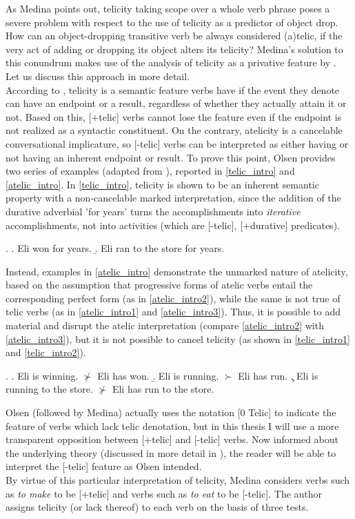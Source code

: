 As Medina points out, telicity taking scope over a whole verb phrase poses a severe problem with respect to the use of telicity as a predictor of object drop. How can an object-dropping transitive verb be always considered (a)telic, if the very act of adding or dropping its object alters its telicity? Medina's solution to this conundrum makes use of the analysis of telicity as a privative feature by \textcite{Olsen1997}. Let us discuss this approach in more detail.\\
According to \textcite[32]{Olsen1997}, telicity is a semantic feature verbs have if the event they denote can have an endpoint or a result, regardless of whether they actually attain it or not. Based on this, [+telic] verbs cannot lose the feature even if the endpoint is not realized as a syntactic constituent. On the contrary, atelicity is a cancelable conversational implicature, so [-telic] verbs can be interpreted as either having or not having an inherent endpoint or result. To prove this point, Olsen provides two series of examples (adapted from \textcite[33]{Olsen1997}), reported in \ref{telic_intro} and \ref{atelic_intro}. In \ref{telic_intro}, telicity is shown to be an inherent semantic property with a non-cancelable marked interpretation, since the addition of the durative adverbial 'for years' turns the accomplishments into \textit{iterative} accomplishments, not into activities (which are [-telic], [+durative] predicates).

\ex. \label{telic_intro} \a. \label{telic_intro1} Eli won for years.
\b. \label{telic_intro2}  Eli ran to the store for years.

Instead, examples in \ref{atelic_intro} demonstrate the unmarked nature of atelicity, based on the assumption that progressive forms of atelic verbs entail the corresponding perfect form (as in \ref{atelic_intro2}), while the same is not true of telic verbs (as in \ref{atelic_intro1} and \ref{atelic_intro3}). Thus, it is possible to add material and disrupt the atelic interpretation (compare \ref{atelic_intro2} with \ref{atelic_intro3}), but it is not possible to cancel telicity (as shown in \ref{telic_intro1} and \ref{telic_intro2}).

\ex. \label{atelic_intro} \a. \label{atelic_intro1} Eli is winning. $\nsucc$ Eli has won.
\b. \label{atelic_intro2}  Eli is running. $\succ$ Eli has run.
\c. \label{atelic_intro3}  Eli is running to the store. $\nsucc$ Eli has run to the store.

Olsen (followed by Medina) actually uses the notation [0 Telic] to indicate the feature of verbs which lack telic denotation, but in this thesis I will use a more transparent opposition between [+telic] and [-telic] verbs. Now informed about the underlying theory (discussed in more detail in ), the reader will be able to interpret the [-telic] feature as Olsen intended.\\
By virtue of this particular interpretation of telicity, Medina considers verbs such as \textit{to make} to be [+telic] and verbs such as \textit{to eat} to be [-telic]. The author assigns telicity (or lack thereof) to each verb on the basis of three tests.

